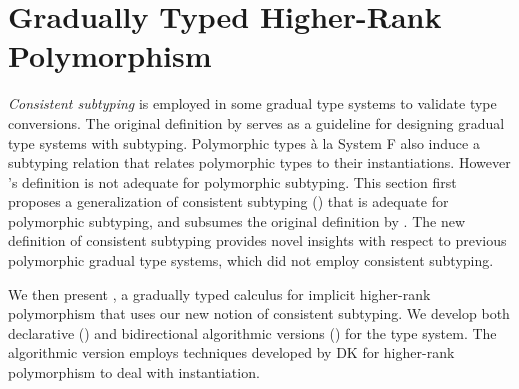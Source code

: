 \chapter{Gradually Typed Higher-Rank Polymorphism}
\label{chap:Gradual}

\textit{Consistent subtyping} is employed in some gradual type systems to validate type
conversions. The original definition by \citet{siek2007gradual} serves as
a guideline for designing gradual type systems with subtyping. Polymorphic
types \`a la System F also induce a subtyping relation that relates
polymorphic types to their instantiations. However
\citeauthor{siek2007gradual}'s definition is not adequate for polymorphic
subtyping.
This section first proposes a generalization of consistent subtyping
() that is adequate for polymorphic subtyping, and
subsumes the original definition by \citeauthor{siek2007gradual}. The new
definition of consistent subtyping provides novel insights with respect to
previous polymorphic gradual type systems, which did not employ consistent
subtyping.

We then present \gpc, a gradually typed calculus for implicit
higher-rank polymorphism that uses our new notion of consistent subtyping. We
develop both declarative () and bidirectional
algorithmic versions () for the type system. The
algorithmic version employs techniques developed by DK \citep{DK} for
higher-rank polymorphism to deal with instantiation.








